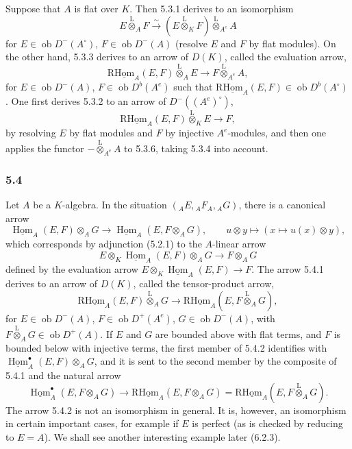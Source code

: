 \documentclass[11pt]{article}
\providecommand{\uHom}{\underline{\Hom}}
\DeclareMathOperator{\Hom}{Hom}
\newcommand{\ob}{\operatorname{ob}}
\providecommand{\lten}{\overset{\mathrm L}{\otimes}}
\providecommand{\Hom}{\operatorname{Hom}}
\providecommand{\ob}{\operatorname{ob}}
\providecommand{\lten}{\overset{\mathrm L}{\otimes}}
\providecommand{\lten}{\overset{\mathrm L}{\otimes}}
\providecommand{\lten}{\overset{\mathrm L}{\otimes}}
\providecommand{\lten}{\overset{\mathrm L}{\otimes}}
\providecommand{\lten}{\overset{\mathrm L}{\otimes}}
\providecommand{\Hom}{\operatorname{Hom}}
\providecommand{\lten}{\overset{\mathrm L}{\otimes}}
\begin{document}
Suppose that $A$ is flat over $K$. Then 5.3.1 derives to an isomorphism
\begin{equation}\tag{5.3.4}
E\lten_AF\xrightarrow{\sim}(E\lten_KF)\lten_{A^e}A
\end{equation}
for $E\in\ob D^-(A^\circ)$, $F\in\ob D^-(A)$ (resolve $E$ and $F$ by flat modules). On the other hand, 5.3.3 derives to an arrow of $D(K)$, called the evaluation arrow,
\begin{equation}\tag{5.3.5}
\mathrm{R}\underline{\mathrm{Hom}}_A(E,F)\lten_AE\longrightarrow F\lten_{A^e}A,
\end{equation}
for $E\in\ob D^-(A)$, $F\in\ob D^b(A^e)$ such that $\mathrm{R}\underline{\mathrm{Hom}}_A(E,F)\in\ob D^b(A^\circ)$. One first derives 5.3.2 to an arrow of $D^-((A^e)^\circ)$,
\begin{equation}\tag{5.3.6}
\mathrm{R}\underline{\mathrm{Hom}}_A(E,F)\lten_KE\longrightarrow F,
\end{equation}
by resolving $E$ by flat modules and $F$ by injective $A^e$-modules, and then one applies the functor $-\lten_{A^e}A$ to 5.3.6, taking 5.3.4 into account.

\subsubsection*{5.4}

Let $A$ be a $K$-algebra. In the situation $({}_AE,{}_AF_A,{}_AG)$, there is a canonical arrow
\begin{equation}\tag{5.4.1}
\uHom_A(E,F)\otimes_AG\longrightarrow\uHom_A(E,F\otimes_AG),
\qquad u\otimes y\longmapsto(x\longmapsto u(x)\otimes y),
\end{equation}
which corresponds by adjunction (5.2.1) to the $A$-linear arrow
\[
E\otimes_K\uHom_A(E,F)\otimes_AG\longrightarrow F\otimes_AG
\]
defined by the evaluation arrow $E\otimes_K\uHom_A(E,F)\to F$. The arrow 5.4.1 derives to an arrow of $D(K)$, called the tensor-product arrow,
\begin{equation}\tag{5.4.2}
\mathrm{R}\underline{\mathrm{Hom}}_A(E,F)\lten_AG\longrightarrow\mathrm{R}\underline{\mathrm{Hom}}_A(E,F\lten_AG),
\end{equation}
for $E\in\ob D^-(A)$, $F\in\ob D^+(A^e)$, $G\in\ob D^-(A)$, with $F\lten_AG\in\ob D^+(A)$. If $E$ and $G$ are bounded above with flat terms, and $F$ is bounded below with injective terms, the first member of 5.4.2 identifies with $\uHom_A^\bullet(E,F)\otimes_AG$, and it is sent to the second member by the composite of 5.4.1 and the natural arrow
\[
\uHom_A^\bullet(E,F\otimes_AG)\longrightarrow \mathrm{R}\underline{\mathrm{Hom}}_A(E,F\otimes_AG)=\mathrm{R}\underline{\mathrm{Hom}}_A(E,F\lten_AG).
\]
The arrow 5.4.2 is not an isomorphism in general. It is, however, an isomorphism in certain important cases, for example if $E$ is perfect (as is checked by reducing to $E=A$). We shall see another interesting example later (6.2.3).
\end{document}
